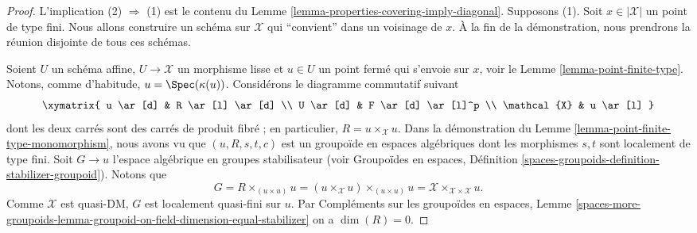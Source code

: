 \begin{proof}
L'implication (2) $\Rightarrow$ (1) est le contenu du
Lemme \ref{lemma-properties-covering-imply-diagonal}.
Supposons (1).
Soit $x \in |\mathcal{X}|$ un point de type fini. Nous allons construire un
schéma sur $\mathcal{X}$ qui ``convient'' dans un voisinage de $x$. À la fin
de la démonstration, nous prendrons la réunion disjointe de tous ces schémas.

\medskip\noindent
Soient $U$ un schéma affine, $U \to \mathcal{X}$ un morphisme lisse et
$u \in U$ un point fermé qui s'envoie sur $x$, voir le
Lemme \ref{lemma-point-finite-type}.
Notons, comme d'habitude, $u = \Spec(\kappa(u))$. Considérons le diagramme
commutatif suivant
$$
\xymatrix{
u \ar[d] & R \ar[l] \ar[d] \\
U \ar[d] & F \ar[d] \ar[l]^p \\
\mathcal{X} & u \ar[l]
}
$$
dont les deux carrés sont des carrés de produit fibré ; en particulier,
$R = u \times_\mathcal{X} u$. Dans la démonstration du
Lemme \ref{lemma-point-finite-type-monomorphism}, nous avons vu que
$(u, R, s, t, c)$ est un groupoïde en espaces algébriques dont les morphismes
$s, t$ sont localement de type fini. Soit $G \to u$ l'espace algébrique en groupes
stabilisateur (voir Groupoïdes en espaces, Définition
\ref{spaces-groupoids-definition-stabilizer-groupoid}).
Notons que
$$
G = R \times_{(u \times u)} u =
(u \times_\mathcal{X} u) \times_{(u \times u)} u =
\mathcal{X} \times_{\mathcal{X} \times \mathcal{X}} u.
$$
Comme $\mathcal{X}$ est quasi-DM, $G$ est localement quasi-fini sur $u$. Par
Compléments sur les groupoïdes en espaces, Lemme
\ref{spaces-more-groupoids-lemma-groupoid-on-field-dimension-equal-stabilizer}
on a $\dim(R) = 0$.


\end{proof}
